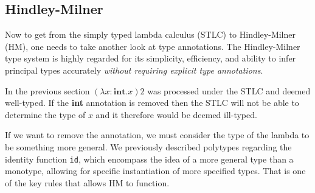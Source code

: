 \documentclass{l4proj}
\begin{document}




\subsection{Hindley-Milner}



Now to get from the simply typed lambda calculus (STLC) to Hindley-Milner (HM), one needs to take another look at type annotations.
The Hindley-Milner type system is highly regarded for its simplicity, efficiency, and ability to infer principal types accurately \emph{without requiring explicit type annotations}.

In the previous section $(\lambda x:\textbf{int}. x) 2$ was processed under the STLC and deemed well-typed.
If the \textbf{int} annotation is removed then the STLC will not be able to determine the type of $x$ and it therefore would be deemed ill-typed.

If we want to remove the annotation, we must consider the type of the lambda to be something more general.
We previously described polytypes regarding the identity function \texttt{id}, which encompass the idea of a more general type than a monotype, allowing for specific instantiation of more specified types.
That is one of the key rules that allows HM to function.
\end{document}
